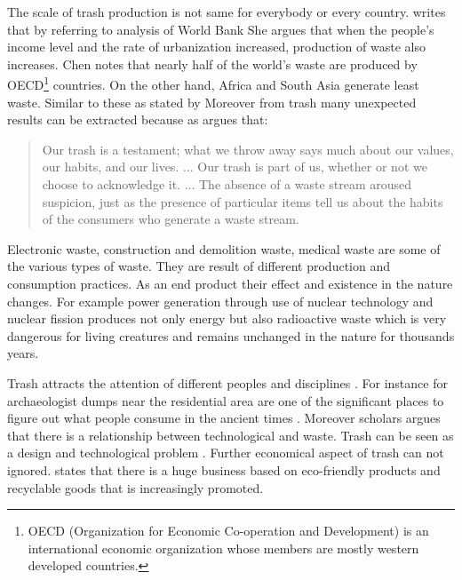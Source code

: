The scale of trash production is not same for everybody or every country. \citet[2]{chen2015waste} writes that by referring to analysis of World Bank  She argues that when the people's income level and the rate of urbanization increased, production of waste also increases. Chen notes that nearly half of the world’s waste are produced by OECD\footnote{OECD (Organization for Economic Co-operation and Development) is an international economic organization whose members are mostly western developed countries.} countries. On the other hand, Africa and South Asia generate least waste. Similar to these as stated by \citet[16]{cerny1996recycled}  Moreover from trash many unexpected results can be extracted because as \citet[xxv]{zimring2012encyclopedia} argues that:

\begin{quote}
Our trash is a testament; what we throw away says much about our values, our habits, and our lives. ... Our trash is part of us, whether or not we choose to acknowledge it. ... The absence of a waste stream aroused suspicion, just as the presence of particular items tell us about the habits of the consumers who generate a waste stream.
\end{quote}

Electronic waste, construction and demolition waste, medical waste are some of the various types of waste. They are result of different production and consumption practices. As an end product their effect and existence in the nature changes. For example power generation through use of nuclear technology and nuclear fission produces not only energy but also radioactive waste which is very dangerous for living creatures and remains unchanged in the nature for thousands years.

Trash attracts the attention of different peoples and disciplines  \citep[63]{emgin2012trashion}. For instance for archaeologist dumps near the residential area are one of the significant places to figure out what people consume in the ancient times \citep{rathje1992rubbish}. Moreover scholars argues that there is a relationship between technological and waste. Trash can be seen as a design and technological problem \citep{mcdonough2010cradle}. Further economical aspect of trash can not ignored. \citet[65]{emgin2012trashion} states that there is a huge business based on eco-friendly products and recyclable goods that is increasingly promoted.

